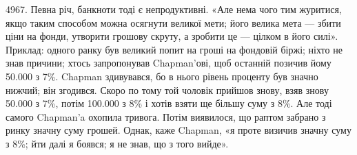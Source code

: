 4967. Певна річ, банкноти тоді є непродуктивні. «Але нема чого тим
журитися, якщо таким способом можна осягнути великої мети; його велика
мета — збити ціни на фонди, утворити грошову скруту, а зробити це — цілком
в його силі». Приклад: одного ранку був великий попит на гроші на фондовій
біржі; ніхто не знав причини; хтось запропонував Chapman’ові, щоб останній
позичив йому \num{50.000} з 7\%. Chapman здивувався, бо в нього рівень
проценту був значно нижчий; він згодився. Скоро по тому той чоловік прийшов
знову, взяв знову \num{50.000} з 7\%, потім \num{100.000} з 8\% і хотів
взяти ще більшу суму з 8\%. Але тоді самого Chapman’a охопила тривога.
Потім виявилося, що раптом забрано з ринку значну суму грошей. Однак, каже
Chapman, «я проте визичив значну суму з 8\%; йти далі я боявся; я не знав,
що з того вийде».
